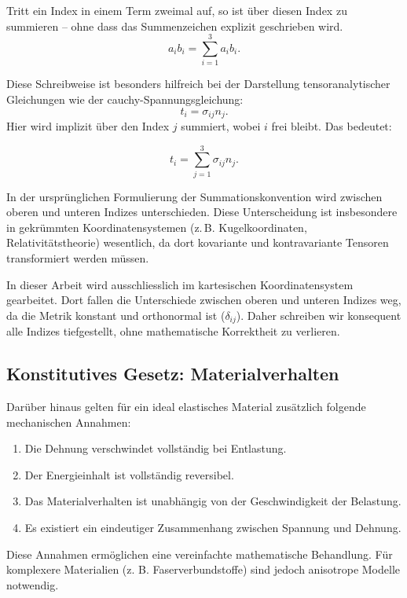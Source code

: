 \medskip
\begin{definition} 
	Tritt ein Index in einem Term zweimal auf, so ist über diesen Index zu summieren – ohne dass das Summenzeichen explizit geschrieben wird.
\begin{equation*}
	a_i b_i = 
	\sum_{i=1}^3 a_i b_i.
\end{equation*}
\end{definition} 
Diese Schreibweise ist besonders hilfreich bei der Darstellung tensoranalytischer Gleichungen wie der cauchy-Spannungsgleichung:
\begin{equation*}
	t_i = 
	\sigma_{ij} n_j.
\end{equation*}
Hier wird implizit über den Index $j$ summiert, wobei $i$ frei bleibt. Das bedeutet:

\begin{equation*}
	t_i = 
	\sum_{j=1}^{3} \sigma_{ij} n_j.
\end{equation*}

In der ursprünglichen Formulierung der Summationskonvention wird zwischen oberen und unteren Indizes unterschieden. 
Diese Unterscheidung ist insbesondere in gekrümmten Koordinatensystemen (z.\,B. Kugelkoordinaten, Relativitätstheorie) wesentlich, da dort kovariante und kontravariante Tensoren transformiert werden müssen.

In dieser Arbeit wird ausschliesslich im kartesischen Koordinatensystem gearbeitet. Dort fallen die Unterschiede zwischen oberen und unteren Indizes weg, da die Metrik konstant und orthonormal ist ($\delta_{ij}$). 
Daher schreiben wir konsequent alle Indizes tiefgestellt, ohne mathematische Korrektheit zu verlieren.


\subsection{Konstitutives Gesetz: Materialverhalten}
Darüber hinaus gelten für ein ideal elastisches Material zusätzlich folgende mechanischen Annahmen:
\begin{enumerate}
	\item Die Dehnung verschwindet vollständig bei Entlastung.
	\item Der Energieinhalt ist vollständig reversibel.
	\item Das Materialverhalten ist unabhängig von der Geschwindigkeit der Belastung.
	\item Es existiert ein eindeutiger Zusammenhang zwischen Spannung und Dehnung.
\end{enumerate}
Diese Annahmen ermöglichen eine vereinfachte mathematische Behandlung. 
Für komplexere Materialien (z. B. Faserverbundstoffe) sind jedoch anisotrope Modelle notwendig.

